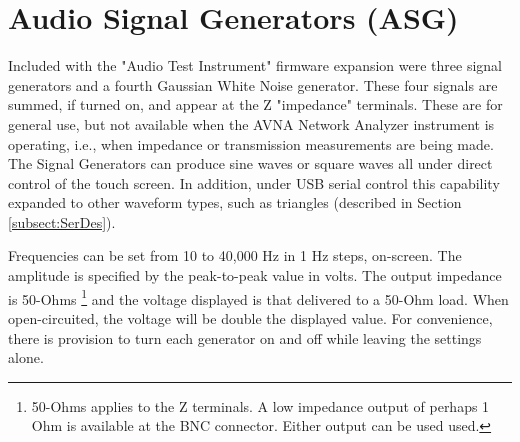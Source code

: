 \section{Audio Signal Generators (ASG)}
\label{sect:ASG}
Included with the "Audio Test Instrument" firmware expansion were three signal generators and a fourth Gaussian White Noise generator. These four signals are summed, if turned on, and appear at the Z "impedance" terminals.  These are for general use, but not available when the AVNA Network Analyzer instrument is operating, i.e., when impedance or transmission measurements are being made.  The Signal Generators can produce sine waves or square waves all under direct control of the touch screen.  In addition, under USB serial control this capability  expanded to other waveform types, such as triangles (described in Section \ref{subsect:SerDes}).

Frequencies can be set from 10 to 40,000 Hz in 1 Hz steps, on-screen.  The amplitude is specified by the peak-to-peak value in volts.  The output impedance is 50-Ohms
%
\footnote{50-Ohms applies to the Z terminals.  A low impedance output of perhaps 1 Ohm is available at the BNC connector.  Either output can be used used.  }
%
 and the voltage displayed is that delivered to a 50-Ohm load. When open-circuited, the voltage will be double the displayed value.  For convenience, there is provision to turn each generator on and off while leaving the settings alone.


